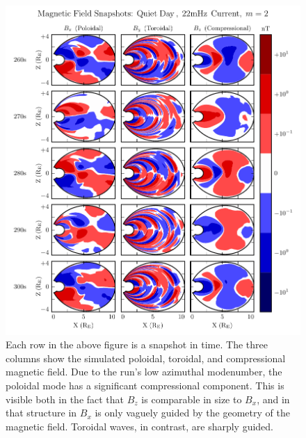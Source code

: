 \begin{figure}[!htb]
    \centering
    \includegraphics[width=\textwidth]{figures/snapshot_smallm.pdf}
    \caption[Magnetic Field Snapshots from a Small-\azm Run]{
      Each row in the above figure is a snapshot in time. The three columns show the simulated poloidal, toroidal, and compressional magnetic field. Due to the run's low azimuthal modenumber, the poloidal mode has a significant compressional component. This is visible both in the fact that $B_z$ is comparable in size to $B_x$, and in that structure in $B_x$ is only vaguely guided by the geometry of the magnetic field. Toroidal waves, in contrast, are sharply guided. 
    }
    \label{fig_snapshot_smallm}
\end{figure}

